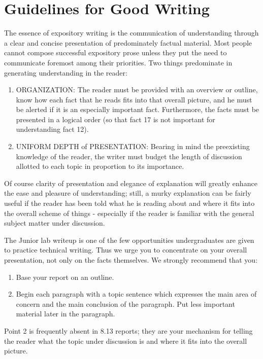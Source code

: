 \section{Guidelines for Good Writing \cite{pritchard1990}}

The essence of expository writing is the communication of
understanding through a clear and concise presentation of
predominately factual material. Most people cannot compose
successful expository prose unless they put the need to communicate
foremost among their priorities. Two things predominate in
generating understanding in the reader:
\begin{enumerate}
\item ORGANIZATION: The reader must be provided with an overview or
outline, know how each fact that he reads fits into that overall
picture, and he must be alerted if it is an especially important
fact. Furthermore, the facts must be presented in a logical order
(so that fact 17 is not important for understanding fact 12).

\item UNIFORM DEPTH of PRESENTATION: Bearing in mind the preexisting
knowledge of the reader, the writer must budget the length of
discussion allotted to each topic in proportion to its importance.

\end{enumerate}

Of course clarity of presentation and elegance of explanation will
greatly enhance the ease and pleasure of understanding; still, a
murky explanation can be fairly useful if the reader has been told
what he is reading about and where it fits into the overall scheme
of things - especially if the reader is familiar with the general
subject matter under discussion.

The Junior lab writeup is one of the few opportunities
undergraduates are given to practice technical writing. Thus we urge
you to concentrate on your overall presentation, not only on the
facts themselves. We strongly recommend that you:
\begin{enumerate}
\item Base your report on an outline.
\item Begin each paragraph with a topic sentence which expresses the
main area of concern and the main conclusion of the paragraph. Put
less important material later in the paragraph.
\end{enumerate}

Point 2 is frequently absent in 8.13 reports; they are your
mechanism for telling the reader what the topic under discussion is
and where it fits into the overall picture.

